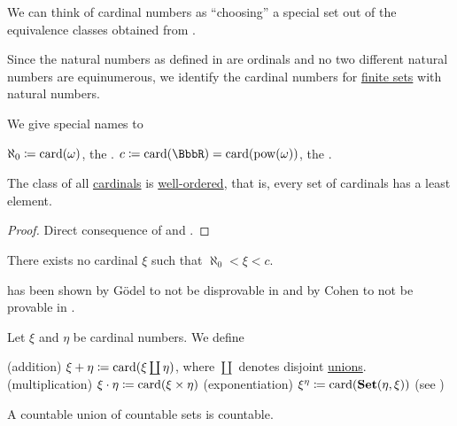 \begin{remark}\label{rem:cardinals}
  We can think of cardinal numbers as \enquote{choosing} a special set out of the equivalence classes obtained from .

  Since the natural numbers as defined in  are ordinals and no two different natural numbers are equinumerous, we identify the cardinal numbers for \hyperref[def:finite_set]{finite sets} with natural numbers.

  We give special names to
  \begin{thmenum}
     \( \aleph_0 \coloneqq \operatorname{card}(\omega) \), the .
     \( c \coloneqq \card(\BbbR) = \card(\pow(\omega)) \), the .
  \end{thmenum}
\end{remark}

\begin{proposition}\label{thm:cardinals_well_ordered}
  The class of all \hyperref[def:cardinal]{cardinals} is \hyperref[def:well_ordered_set]{well-ordered}, that is, every set of cardinals has a least element.
\end{proposition}
\begin{proof}
  Direct consequence of  and .
\end{proof}

\begin{conjecture}\label{hyp:continuum_hypothesis}
  There exists no cardinal \( \xi \) such that \( \aleph_0 < \xi < c \).
\end{conjecture}

\medskip

\begin{remark}\label{rem:continuum_hypothesis}
   has been shown by G\"odel to not be disprovable in \hyperref[def:set]{} and by Cohen to not be provable in .
\end{remark}

\begin{definition}\label{def:cardinal_arithmetic}
  Let \( \xi \) and \( \eta \) be cardinal numbers. We define
  \begin{thmenum}
    (addition) \( \xi + \eta \coloneqq \operatorname{card}(\xi \coprod \eta) \), where \( \coprod \) denotes disjoint \hyperref[def:disjoint_union]{unions}.
    (multiplication) \( \xi \cdot \eta \coloneqq \operatorname{card}(\xi \times \eta) \)
    (exponentiation) \( \xi^\eta \coloneqq \operatorname{card}(\operatorname{\mathbf{Set}}(\eta, \xi)) \) (see )
  \end{thmenum}
\end{definition}

\begin{proposition}\label{thm:countable_union_of_countable_sets}
  A countable union of countable sets is countable.
\end{proposition}
